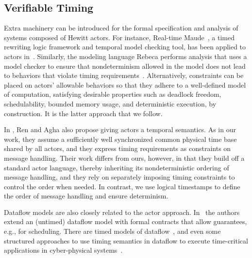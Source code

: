 \documentclass[sigconf]{acmart}
\newcommand{\marten}[1]{\mynote{Marten}{#1}{cyan}}%
\newcommand{\marjan}[1]{\mynote{Marjan}{#1}{magenta}}%
\begin{document}
\subsection{Verifiable Timing}\label{sec:related}
Extra machinery can be introduced for the formal specification and analysis of systems composed of Hewitt actors.
For instance, Real-time Maude~\cite{olveczky:2008:real}, a timed rewriting logic framework and temporal model checking tool, has been applied to actors in~\cite{Ding2003}.
Similarly, the modeling language Rebeca performs analysis that uses a model checker to ensure that nondeterminism allowed in the model does not lead to behaviors that violate timing requirements~\cite{KHAMESPANAH2015184}.
Alternatively, constraints can be placed on actors' allowable behaviors so that they adhere to a well-defined model of computation, satisfying desirable properties such as deadlock freedom, schedulability, bounded memory usage, and deterministic execution, by construction. It is the latter approach that we follow.

In \cite{ren1995rtsynchronizer}, Ren and Agha also propose giving actors a temporal
semantics. As in our work, they assume a sufficiently well synchronized
common physical time base shared by all actors, and they express timing
requirements as constraints on message handling. Their work differs from
ours, however, in that they build off a standard actor language, thereby
inheriting its nondeterministic ordering of message handling, and they
rely on separately imposing timing constraints to control the order when
needed. In contrast, we use logical timestamps to define the order of
message handling and ensure determinism.

Dataflow models are also closely related to the actor approach. In~\cite{wiik2018contract} the authors extend an (untimed) dataflow model with formal contracts that allow guarantees, e.g., for scheduling.
There are timed models of dataflow~\cite{Sriram:00:Scheduling}, and even some structured approaches to use timing semantics in dataflow to execute time-critical applications in cyber-physical systems~\cite{GeilenEtAl:12:Scenarios}.
\end{document}
